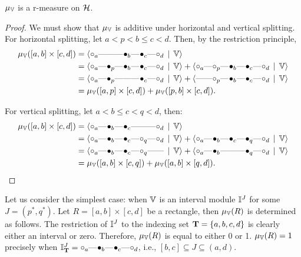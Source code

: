 \begin{proposition}
$\mu_{\mathbb{V}}$ is a r-measure on $\mathcal{H}$.
\end{proposition}
\begin{proof}
We must show that $\mu_{\mathbb{V}}$ is additive under horizontal and vertical splitting. For horizontal splitting, let $a < p < b \leq c < d$. Then, by the restriction principle,
\begin{align*}
\mu_\V([a, b] \times [c, d]) &= \langle \qoff{a} \qem \qno \qem \qon{b} \qem \qon{c} \qem \qoff{d} \st \V \rangle\\
&= \langle \qoff{a} \qem \qon{p} \qem \qon{b} \qem \qon{c} \qem \qoff{d} \st \V \rangle + \langle \qoff{a} \qem \qoff{p} \qem \qon{b} \qem \qon{c} \qem \qoff{d} \st \V \rangle \\
&= \langle \qoff{a} \qem \qon{p} \qem \qno \qem \qon{c} \qem \qoff{d} \st \V \rangle + \langle \qno \qem \qoff{p} \qem \qon{b} \qem \qon{c} \qem \qoff{d} \st \V \rangle \\
&= \mu_\V([a, p] \times [c, d]) + \mu_\V([p, b] \times [c, d]).
\end{align*}

For vertical splitting, let $a < b \leq c < q < d$, then:
\begin{align*}
\mu_\V([a, b] \times [c, d]) &= \langle \qoff{a} \qem \qon{b} \qem \qon{c} \qem \qno \qem \qoff{d} \st \V \rangle\\
&= \langle \qoff{a} \qem \qon{b} \qem \qon{c} \qem \qoff{q} \qem \qoff{d} \st \V \rangle + \langle \qoff{a} \qem \qon{b} \qem \qon{c} \qem \qon{q} \qem \qoff{d} \st \V \rangle  \\
&= \langle \qoff{a} \qem \qon{b} \qem \qon{c} \qem \qoff{q} \qno \qem  \st \V \rangle + \langle \qoff{a} \qem \qon{b} \qem \qno \qem \qon{q} \qem \qoff{d} \st \V \rangle \\
&= \mu_\V([a, b] \times [c, q]) + \mu_\V([a, b] \times [q, d]).
\end{align*}
\end{proof}

Let us consider the simplest case: when $\mathbb{V}$ is an interval module $\mathbb{I}^J$ for some $J = (p^*, q^*)$. Let $R = [a, b] \times [c, d]$ be a rectangle, then $\mu_{\mathbb{V}}(R)$ is determined as follows. The restriction of $\mathbb{I}^J$ to the indexing set $\mathbf{T} = \{a, b, c, d\}$ is clearly either an interval or zero. Therefore, $\mu_{\mathbb{V}}(R)$ is equal to either 0 or 1. $\mu_{\mathbb{V}}(R) = 1$ precisely when $\I^J_\T = \qoff{a} \qem \qon{b} \qem \qon{c} \qem \qoff{d}$, i.e., $[b, c] \subseteq J \subseteq (a, d)$.

